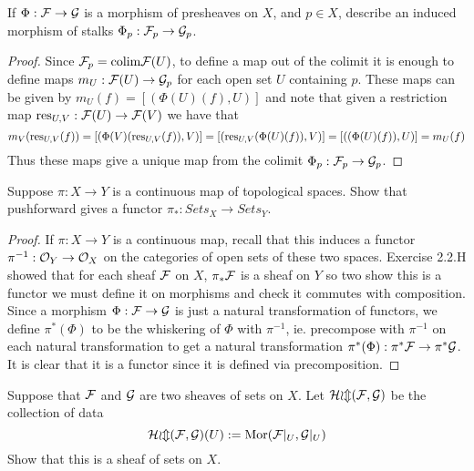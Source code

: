 
\begin{exercise}
    If $\Phi: \mathcal{F} \to \mathcal{G}$ is a morphism of presheaves on $X$, and $p \in X$, describe an induced morphism of stalks $\Phi_p: \mathcal{F}_p \to \mathcal{G}_p$.
\end{exercise}

\begin{proof}
    Since $\mathcal{F}_p = \text{colim} \mathcal{F}(U)$, to define a map out of the colimit it is enough to define maps $m_U: \mathcal{F}(U) \to \mathcal{G}_p$ for each open set $U$ containing $p$. These maps can be given by $m_U(f) = [(\Phi(U)(f), U)]$ and note that given a restriction map $\text{res}_{U, V}: \mathcal{F}(U) \to \mathcal{F}(V)$ we have that 
    \[ m_V( \text{res}_{U, V}(f)) = [( \Phi(V)(\text{res}_{U, V}(f)), V)]  = [( \text{res}_{U, V}(\Phi(U)(f)), V)] = [((\Phi(U)(f)), U)] = m_U(f) \]
    Thus these maps give a unique map from the colimit $\Phi_p: \mathcal{F}_p \to \mathcal{G}_p$. 
\end{proof}

\begin{exercise}
    Suppose $\pi: X \to Y$ is a continuous map of topological spaces. Show that pushforward gives a functor $\pi_*: Sets_X \to Sets_Y$.
\end{exercise}

\begin{proof}
    If $\pi: X \to Y$ is a continuous map, recall that this induces a functor $\pi^{-1}: \mathcal{O}_Y \to \mathcal{O}_X$ on the categories of open sets of these two spaces. Exercise 2.2.H showed that for each sheaf $\mathcal{F}$ on $X$, $\pi_*\mathcal{F}$ is a sheaf on $Y$ so two show this is a functor we must define it on morphisms and check it commutes with composition. Since a morphism $\Phi: \mathcal{F} \to \mathcal{G}$ is just a natural transformation of functors, we define $\pi^*(\Phi)$ to be the whiskering of $\Phi$ with $\pi^{-1}$, ie. precompose with $\pi^{-1}$ on each natural transformation to get a natural transformation $\pi^*(\Phi): \pi^*\mathcal{F} \to \pi^* \mathcal{G}$. It is clear that it is a functor since it is defined via precomposition. 
\end{proof}

\begin{exercise}
    Suppose that $\mathcal{F}$ and $\mathcal{G}$ are two sheaves of sets on $X$. Let $\mathcal{Hom}(\mathcal{F}, \mathcal{G})$ be the collection of data 
    \[ \mathcal{Hom}(\mathcal{F}, \mathcal{G})(U):= \text{Mor}(\mathcal{F}|_{U}, \mathcal{G}|_{U}) \] 
    Show that this is a sheaf of sets on $X$. 
\end{exercise}

